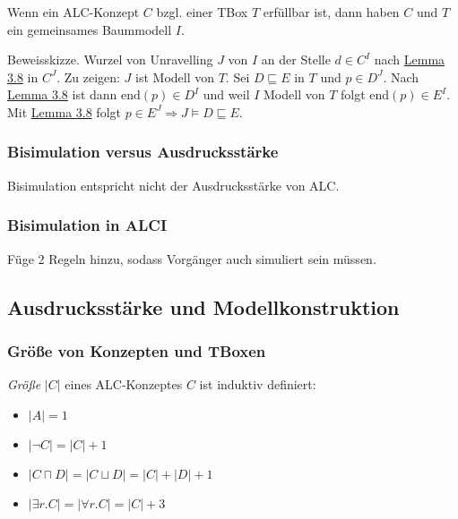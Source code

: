 Wenn ein ALC-Konzept $C$ bzgl. einer TBox $T$ erfüllbar ist, dann
haben $C$ und $T$ ein gemeinsames Baummodell $I$.

Beweisskizze. Wurzel von Unravelling $J$ von $I$ an der Stelle
$d \in C^{I}$ nach \protect\hyperlink{lemma-3.8}{Lemma 3.8} in
$C^{J}$. Zu zeigen: $J$ ist Modell von $T$. Sei
$D \sqsubseteq E$ in $T$ und $p \in D^{J}$. Nach
\protect\hyperlink{lemma-3.8}{Lemma 3.8} ist dann
$\text{end}\left( p \right) \in D^{I}$ und weil $I$ Modell von $T$
folgt $\text{end}\left( p \right) \in E^{I}$. Mit
\protect\hyperlink{lemma-3.8}{Lemma 3.8} folgt
$p \in E^{J} \Rightarrow J \vDash D \sqsubseteq E$.

\subsubsection{Bisimulation versus
Ausdrucksstärke}\label{bisimulation-versus-ausdrucksstuxe4rke}

Bisimulation entspricht nicht der Ausdrucksstärke von ALC.

\subsubsection{Bisimulation in ALCI}\label{bisimulation-in-alci}

Füge 2 Regeln hinzu, sodass Vorgänger auch simuliert sein müssen.

\subsection{Ausdrucksstärke und
Modellkonstruktion}\label{ausdrucksstuxe4rke-und-modellkonstruktion}

\subsubsection{Größe von Konzepten und
TBoxen}\label{gruxf6uxdfe-von-konzepten-und-tboxen}

\emph{Größe} $\left| C \right|$ eines ALC-Konzeptes $C$ ist induktiv
definiert:

\begin{itemize}
\item
  $\left| A \right| = 1$
\item
  $\left| \neg C \right| = \left| C \right| + 1$
\item
  $\left| C \sqcap D \right| = \left| C \sqcup D \right| = \left| C \right| + \left| D \right| + 1$
\item
  $\left| \exists r.C \right| = \left| \forall r.C \right| = \left| C \right| + 3$
\end{itemize}

